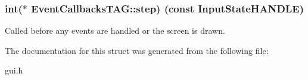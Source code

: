 \subsubsection[{step}]{\setlength{\rightskip}{0pt plus 5cm}int($\ast$ Event\+Callbacks\+T\+A\+G\+::step) (const {\bf Input\+State\+H\+A\+N\+D\+L\+E})}\label{struct_event_callbacks_t_a_g_a0e1bb533268f270bb6c1b67898666f25}
Called before any events are handled or the screen is drawn. 

The documentation for this struct was generated from the following file\+:\begin{DoxyCompactItemize}
\item 
gui.\+h\end{DoxyCompactItemize}
